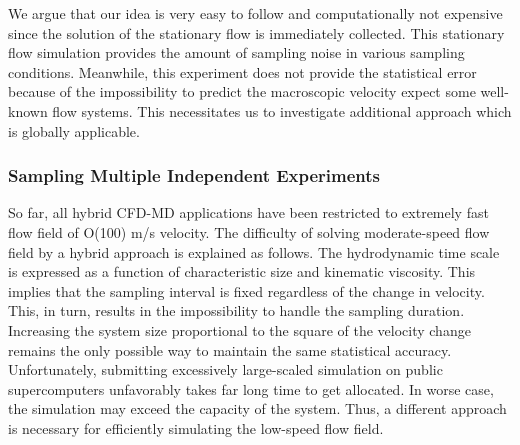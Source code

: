 \documentclass[preprint,12pt]{elsarticle}
\begin{document}

We argue that our idea is very easy to follow and computationally not expensive since the solution of the stationary flow is immediately collected. 
This stationary flow simulation provides the amount of sampling noise in various sampling conditions. 
Meanwhile, this experiment does not provide the statistical error because of the impossibility to predict the macroscopic velocity expect some well-known flow systems. This necessitates us to investigate additional approach which is globally applicable.


\subsubsection{Sampling Multiple Independent Experiments}
\label{sec:numerical_lowspeed}
So far, all hybrid CFD-MD applications have been restricted to extremely fast flow field of O(100) m/s velocity. 
The difficulty of solving moderate-speed flow field by a hybrid approach is explained as follows. The hydrodynamic time scale is expressed as a function of characteristic size and kinematic viscosity. This implies that the sampling interval is fixed regardless of the change in velocity. This, in turn, results in the impossibility to handle the sampling duration. Increasing the system size proportional to the square of the velocity change remains the only possible way to maintain the same statistical accuracy. Unfortunately, submitting excessively large-scaled simulation on public supercomputers unfavorably takes far long time to get allocated. In worse case, the simulation may exceed the capacity of the system. Thus, a different approach is necessary for efficiently simulating the low-speed flow field. 

\end{document}
